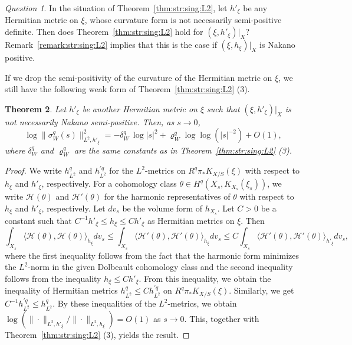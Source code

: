 \documentclass[amscd, leqno]{amsart}
\theoremstyle{plain}
\newtheorem{theorem}{Theorem}[section]
\theoremstyle{definition}
\theoremstyle{remark}
\newtheorem{question}[theorem]{Question}
\newenvironment{pf}{\begin{proof}}{\end{proof}}
\begin{document}
\begin{question}
In the situation of Theorem~\ref{thm:str:sing:L2}, let $h'_{\xi}$ be any Hermitian metric on $\xi$, 
whose curvature form is not necessarily semi-positive definite.
Then does Theorem~\ref{thm:str:sing:L2} hold for $(\xi, h'_{\xi})|_{X}$? Remark~\ref{remark:str:sing:L2} implies that this is the case 
if $(\xi, h_{\xi})|_{X}$ is Nakano positive.
\end{question}

 
If we drop the semi-positivity of the curvature of the Hermitian metric on $\xi$,
we still have the following weak form of Theorem~\ref{thm:str:sing:L2} (3).


\begin{theorem}
\label{thm:asym:L2:weak}
Let $h'_{\xi}$ be another Hermitian metric on $\xi$ such that $(\xi, h'_{\xi})|_{X}$ is not necessarily Nakano semi-positive. 
Then, as $s \to 0$,
$$
\log\|\sigma_{W}^{q}(s)\|_{L^{2}, h'_{\xi}}^{2} = -\delta_{W}^{q}\,\log |s|^{2} + \varrho_{W}^{q} \log\log(|s|^{-2}) + O\left(1 \right),
$$
where $\delta_{W}^{q}$ and $\varrho_{W}^{q}$ are the same constants as in Theorem~\ref{thm:str:sing:L2} (3).
\end{theorem}

\begin{pf}
We write $h^{q}_{L^{2}}$ and $h^{\prime q}_{L^{2}}$ for the $L^{2}$-metrics on $R^{q}\pi_{*}K_{X/S}(\xi)$ with respect to 
$h_{\xi}$ and $h'_{\xi}$, respectively. For a cohomology class $\theta \in H^{q}(X_{s}, K_{X_{s}}(\xi_{s}))$, 
we write ${\mathcal H}(\theta)$ and ${\mathcal H}'(\theta)$ for the harmonic representatives of $\theta$ with respect to 
$h_{\xi}$ and $h'_{\xi}$, respectively. Let $dv_{s}$ be the volume form of $h_{X_{s}}$. 
Let $C>0$ be a constant such that $C^{-1} h'_{\xi} \leq h_{\xi} \leq C h'_{\xi}$ as Hermitian metrics on $\xi$. Then 
$$
\int_{X_{s}} \langle {\mathcal H}(\theta), {\mathcal H}(\theta) \rangle_{h_{\xi}} dv_{s}
\leq
\int_{X_{s}} \langle {\mathcal H}'(\theta), {\mathcal H}'(\theta) \rangle_{h_{\xi}} dv_{s}
\leq
C \int_{X_{s}} \langle {\mathcal H}'(\theta), {\mathcal H}'(\theta) \rangle_{h'_{\xi}} dv_{s},
$$
where the first inequality follows from the fact that the harmonic form minimizes the $L^{2}$-norm in the given Dolbeault cohomology class
and the second inequality follows from the inequality $h_{\xi} \leq C h'_{\xi}$. From this inequality, we obtain the inequality of 
Hermitian metrics $h^{q}_{L^{2}} \leq C h^{\prime q}_{L^{2}}$ on $R^{q}\pi_{*}K_{X/S}(\xi)$. 
Similarly, we get $C^{-1} h^{\prime q}_{L^{2}} \leq h^{q}_{L^{2}}$.
By these inequalities of the $L^{2}$-metrics, we obtain $\log( \| \cdot \|_{L^{2}, h'_{\xi}} / \| \cdot \|_{L^{2}, h_{\xi}} ) = O(1)$ as $s \to 0$.
This, together with Theorem~\ref{thm:str:sing:L2} (3), yields the result.
\end{pf}
\end{document}
